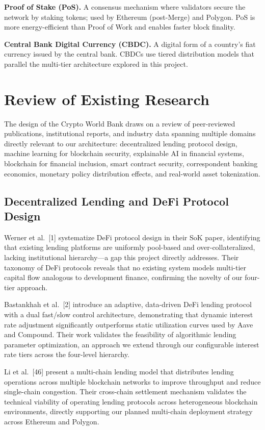 \documentclass[12pt,a4paper]{report}
\begin{document}
\hangindent=0.5in \textbf{Proof of Stake (PoS).} A consensus mechanism where validators secure the network by staking tokens; used by Ethereum (post-Merge) and Polygon. PoS is more energy-efficient than Proof of Work and enables faster block finality.

\hangindent=0.5in \textbf{Central Bank Digital Currency (CBDC).} A digital form of a country's fiat currency issued by the central bank. CBDCs use tiered distribution models that parallel the multi-tier architecture explored in this project.

\section{Review of Existing Research}

The design of the Crypto World Bank draws on a review of peer-reviewed publications, institutional reports, and industry data spanning multiple domains directly relevant to our architecture: decentralized lending protocol design, machine learning for blockchain security, explainable AI in financial systems, blockchain for financial inclusion, smart contract security, correspondent banking economics, monetary policy distribution effects, and real-world asset tokenization.

\subsection{Decentralized Lending and DeFi Protocol Design}

Werner et al.~[1] systematize DeFi protocol design in their SoK paper, identifying that existing lending platforms are uniformly pool-based and over-collateralized, lacking institutional hierarchy---a gap this project directly addresses. Their taxonomy of DeFi protocols reveals that no existing system models multi-tier capital flow analogous to development finance, confirming the novelty of our four-tier approach.

Bastankhah et al.~[2] introduce an adaptive, data-driven DeFi lending protocol with a dual fast/slow control architecture, demonstrating that dynamic interest rate adjustment significantly outperforms static utilization curves used by Aave and Compound. Their work validates the feasibility of algorithmic lending parameter optimization, an approach we extend through our configurable interest rate tiers across the four-level hierarchy.

Li et al.~[46] present a multi-chain lending model that distributes lending operations across multiple blockchain networks to improve throughput and reduce single-chain congestion. Their cross-chain settlement mechanism validates the technical viability of operating lending protocols across heterogeneous blockchain environments, directly supporting our planned multi-chain deployment strategy across Ethereum and Polygon.
\end{document}

